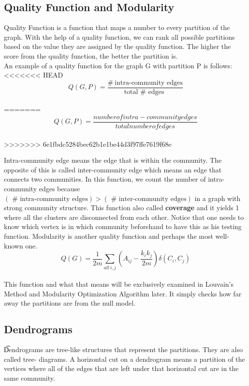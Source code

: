 \documentclass[10pt]{article}
\begin{document}
\subsection{Quality Function and Modularity}

Quality Function is a function that maps a number to every partition of the graph. With the help of a quality function, we can rank all possible partitions based on the value they are assigned by the quality function. The higher the score from the quality function, the better the partition is. \\

An example of a quality function for the graph G with partition P is follows: \\

<<<<<<< HEAD
\[ Q\left( G, P \right) = \frac{ \#\ \text{intra-community edges}  }{\text{total\ $\#$\ edges }  }   \] \\
=======
\[ Q\left( G, P \right)=\frac{number of intra-community edges}{total number of edges} \]\\

>>>>>>> 6e1fbdc5284bec62b1e1be44d3f97ffe7619f68e

Intra-community edge means the edge that is within the community. The opposite of this is called inter-community edge which means an edge that connects two communities. In this function, we count the number of intra-community edges because $\left( \text{ \#\ intra-community edges}\right) > \left(\text{ \#\ inter-community edges}\right)$ in a graph with strong community structure. This function also called \textbf{coverage} and it yields 1 where all the clusters are disconnected from each other. Notice that one needs to know which vertex is in which community beforehand to have this as his testing function.
Modularity is another quality function and perhaps the most well-known one. \\
\[ Q\left(G\right) = \frac{1}{2m}  \sum_{all\ i,j} \left( A_{ij} - \frac{k_i k_j}{2m} \right)  \delta \left( C_i, C_j\right) \] \\
This function and what that means will be exclusively examined in Louvain’s Method and Modularity Optimization Algorithm later. It simply checks how far away the partitions are from the null model.

\subsection{Dendrograms}

\t Dendrograms are tree-like structures that represent the partitions. They are also called tree- diagrams. A horizontal cut on a dendrogram means a partition of the vertices where all of the edges that are left under that horizontal cut are in the same community. \\
\end{document}
